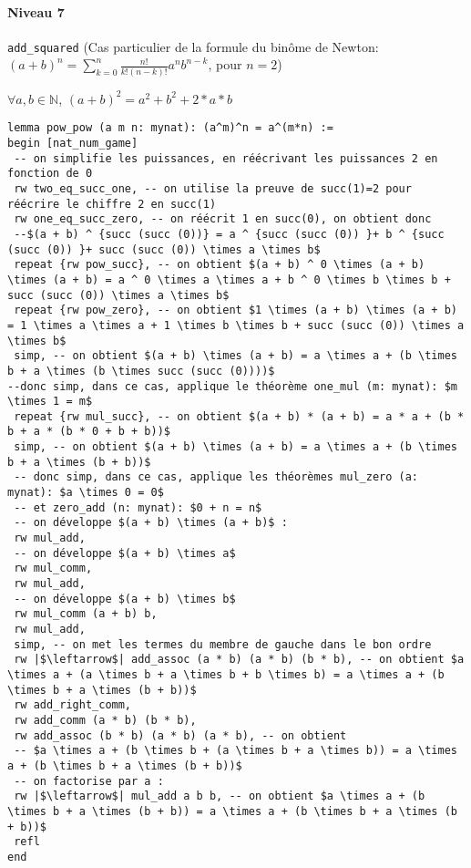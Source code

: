 \paragraph{Niveau 7} \texttt{add\_squared} (Cas particulier de la formule du binôme de Newton: $(a+b)^n=\sum_{k=0}^{n}{\frac{n!}{k!(n-k)!} a^nb^{n-k}}$, pour $n=2$)
\begin{center} $\forall a, b \in \mathbb{N}$, $(a+b)^2=a^2+b^2+2*a*b $\end{center}
\begin{verbatim}
lemma pow_pow (a m n: mynat): (a^m)^n = a^(m*n) :=
begin [nat_num_game]
 -- on simplifie les puissances, en réécrivant les puissances 2 en fonction de 0 
 rw two_eq_succ_one, -- on utilise la preuve de succ(1)=2 pour réécrire le chiffre 2 en succ(1)
 rw one_eq_succ_zero, -- on réécrit 1 en succ(0), on obtient donc 
 --$(a + b) ^ {succ (succ (0))} = a ^ {succ (succ (0)) }+ b ^ {succ (succ (0)) }+ succ (succ (0)) \times a \times b$
 repeat {rw pow_succ}, -- on obtient $(a + b) ^ 0 \times (a + b) \times (a + b) = a ^ 0 \times a \times a + b ^ 0 \times b \times b + succ (succ (0)) \times a \times b$ 
 repeat {rw pow_zero}, -- on obtient $1 \times (a + b) \times (a + b) = 1 \times a \times a + 1 \times b \times b + succ (succ (0)) \times a \times b$
 simp, -- on obtient $(a + b) \times (a + b) = a \times a + (b \times b + a \times (b \times succ (succ (0))))$
--donc simp, dans ce cas, applique le théorème one_mul (m: mynat): $m \times 1 = m$
 repeat {rw mul_succ}, -- on obtient $(a + b) * (a + b) = a * a + (b * b + a * (b * 0 + b + b))$
 simp, -- on obtient $(a + b) \times (a + b) = a \times a + (b \times b + a \times (b + b))$
 -- donc simp, dans ce cas, applique les théorèmes mul_zero (a: mynat): $a \times 0 = 0$ 
 -- et zero_add (n: mynat): $0 + n = n$
 -- on développe $(a + b) \times (a + b)$ :
 rw mul_add,
 -- on développe $(a + b) \times a$ 
 rw mul_comm,
 rw mul_add,
 -- on développe $(a + b) \times b$ 
 rw mul_comm (a + b) b,
 rw mul_add,
 simp, -- on met les termes du membre de gauche dans le bon ordre 
 rw |$\leftarrow$| add_assoc (a * b) (a * b) (b * b), -- on obtient $a \times a + (a \times b + a \times b + b \times b) = a \times a + (b \times b + a \times (b + b))$
 rw add_right_comm,
 rw add_comm (a * b) (b * b),
 rw add_assoc (b * b) (a * b) (a * b), -- on obtient 
 -- $a \times a + (b \times b + (a \times b + a \times b)) = a \times a + (b \times b + a \times (b + b))$
 -- on factorise par a :
 rw |$\leftarrow$| mul_add a b b, -- on obtient $a \times a + (b \times b + a \times (b + b)) = a \times a + (b \times b + a \times (b + b))$
 refl
end
\end{verbatim}
